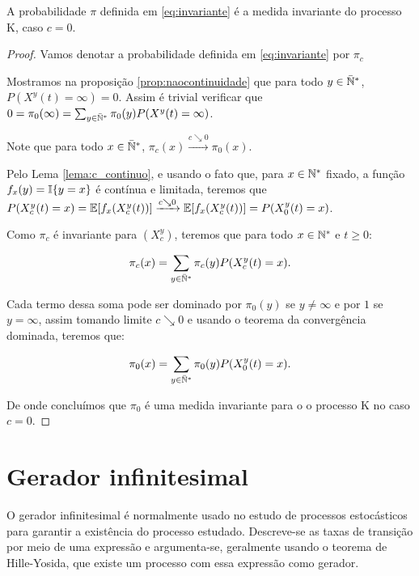 \begin{proposicao}
  A probabilidade $\pi$ definida em \eqref{eq:invariante} é a medida
  invariante do processo K, caso $c = 0$.
\end{proposicao}
\begin{proof}

  Vamos denotar a probabilidade definida em \eqref{eq:invariante} por
  $\pi_c$

  Mostramos na proposição \ref{prop:naocontinuidade} que para todo $y
  \in {\mathbb{\bar{N}^*}}$, $P(X^y(t) = \infty) = 0$. Assim é trivial verificar que
  $0 = \pi_0(\infty) = \sum_{y\in{\mathbb{\bar{N}^*}}} \pi_0(y) P(X^y(t) =
  \infty)$.

  Note que para todo $x \in {\mathbb{\bar{N}^*}}$, $\pi_c(x) \xrightarrow{c\searrow0}
  \pi_0(x)$.

  Pelo Lema \ref{lema:c_continuo}, e usando o fato que, para $x \in
  {\mathbb{N^*}}$ fixado, a função $f_x(y) = {\mathbb{I}}\{y = x\}$ é contínua e
  limitada, teremos que $P(X^y_c (t) = x) = {\mathbb{E}} [f_x(X^y_c(t))]
  \xrightarrow{c\searrow0} {\mathbb{E}} [f_x(X^y_c(t))] = P(X^y_0(t) = x)$.

  Como $\pi_c$ é invariante para $(X^y_c)$, teremos que para todo $x
  \in {\mathbb{N^*}}$ e $t \geq 0$:

  \begin{align*}
    \pi_c(x) &= \sum_{y \in {\mathbb{\bar{N}^*}}} \pi_c (y) P(X^y_c (t) = x).\\
  \end{align*}

  Cada termo dessa soma pode ser dominado por $\pi_0(y)$ se $y \neq
  \infty$ e por $1$ se $y = \infty$, assim tomando limite $c\searrow0$
  e usando o teorema da convergência dominada, teremos que:

  \begin{align*}
    \pi_0(x) &= \sum_{y \in {\mathbb{\bar{N}^*}}} \pi_0 (y) P(X^y_0 (t) = x).\\
  \end{align*}

  De onde concluímos que $\pi_0$ é uma medida invariante para o o
  processo K no caso $c = 0$.
\end{proof}



\section{Gerador infinitesimal}
\label{sec:gerador}


O gerador infinitesimal é normalmente usado no estudo de processos
estocásticos para garantir a existência do processo
estudado. Descreve-se as taxas de transição por meio de uma expressão
e argumenta-se, geralmente usando o teorema de Hille-Yosida, que
existe um processo com essa expressão como gerador.

